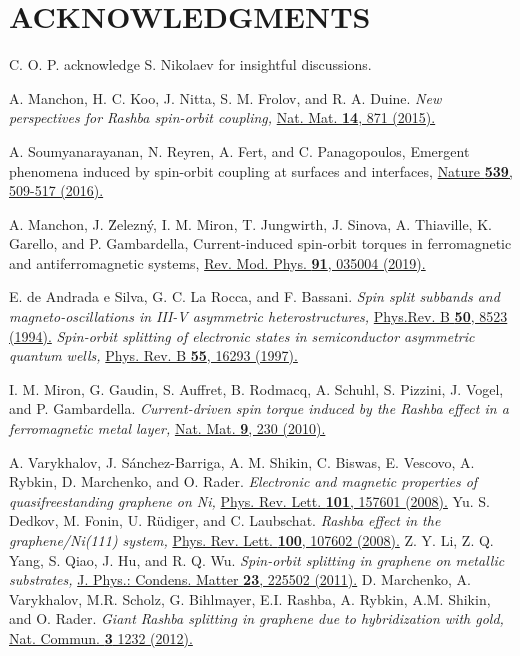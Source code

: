 \documentclass[10pt,pr,twocolumn,showpacs,amssymb,floatfix,superscriptaddress]{revtex4-1}
\begin{document}
\section*{ACKNOWLEDGMENTS}
C. O. P. acknowledge S. Nikolaev for insightful discussions.

\begin{thebibliography}{999}
 A. Manchon, H. C. Koo, J. Nitta, S. M. Frolov, and R. A. Duine. 
\textit{New perspectives for Rashba spin-orbit coupling,}
\href{https://doi.org/10.1038/nmat4360}{Nat. Mat. {\bf 14}, 871 (2015).}

 A. Soumyanarayanan, N. Reyren, A. Fert, and C. Panagopoulos, 
Emergent phenomena induced by spin-orbit coupling at surfaces and interfaces,
\href{https://www.nature.com/articles/nature19820}{Nature {\bf 539}, 509-517 (2016).} 

 A. Manchon, J. \u{Z}elezn\'y, I. M. Miron, T. Jungwirth, J. Sinova, A. Thiaville, K. Garello, and P. Gambardella, 
Current-induced spin-orbit torques in ferromagnetic and antiferromagnetic systems,
\href{https://journals.aps.org/rmp/abstract/10.1103/RevModPhys.91.035004}{Rev. Mod. Phys. {\bf 91}, 035004 (2019).}




 E. de Andrada e Silva, G. C. La Rocca, and F. Bassani. 
\textit{Spin split subbands and magneto-oscillations in III-V asymmetric heterostructures,}
\href{https://doi.org/10.1103/PhysRevB.50.8523}{Phys.Rev. B {\bf 50}, 8523 (1994).}
\textit{Spin-orbit splitting of electronic states in semiconductor asymmetric quantum wells,}
\href{https://doi.org/10.1103/PhysRevB.55.16293}{Phys. Rev. B {\bf 55}, 16293 (1997).}

 I. M. Miron, G. Gaudin, S. Auffret, B. Rodmacq, A. Schuhl, S. Pizzini, J. Vogel, and P. Gambardella. 
\textit{Current-driven spin torque induced by the Rashba effect in a ferromagnetic metal layer,}
\href{https://doi.org/10.1038/nmat2613}{Nat. Mat. {\bf 9}, 230 (2010). }

 A. Varykhalov, J. S\'anchez-Barriga, A. M. Shikin, C. Biswas, E. Vescovo, A. Rybkin, D. Marchenko, and O. Rader. 
\textit{Electronic and magnetic properties of quasifreestanding graphene on Ni,}
\href{https://doi.org/10.1103/PhysRevLett.101.157601}{Phys. Rev. Lett. {\bf 101}, 157601 (2008).}
Yu. S. Dedkov, M. Fonin, U. R\"udiger, and C. Laubschat.
\textit{Rashba effect in the graphene/Ni(111) system,}
\href{https://doi.org/10.1103/PhysRevLett.100.107602}{ Phys. Rev. Lett. {\bf 100}, 107602 (2008).}
Z. Y. Li, Z. Q. Yang, S. Qiao, J. Hu, and R. Q. Wu. 
\textit{Spin-orbit splitting in graphene on metallic substrates,}
\href{https://doi.org/10.1088/0953-8984/23/22/225502}{J. Phys.: Condens. Matter {\bf 23}, 225502 (2011).}
D. Marchenko, A. Varykhalov, M.R. Scholz, G. Bihlmayer, E.I. Rashba, A. Rybkin, A.M. Shikin, and O. Rader. 
\textit{Giant Rashba splitting in graphene due to hybridization with gold,}
\href{https://doi.org/10.1038/ncomms2227}{Nat. Commun. {\bf 3} 1232 (2012).}


\end{thebibliography}
\end{document}
